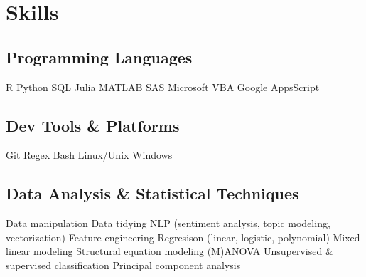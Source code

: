 \documentclass[letterpaper]{deedy-resume_sm} %
\begin{document}

\section{Skills}
\subsection{Programming Languages}
R \textbullet{} Python \textbullet{} SQL \textbullet{} Julia \textbullet{} MATLAB \textbullet{} SAS \textbullet{} Microsoft VBA \textbullet{} Google AppsScript
\subsection{Dev Tools \& Platforms}
Git \textbullet{} Regex \textbullet{} Bash \textbullet{} Linux/Unix \textbullet{} Windows
\subsection{Data Analysis \& Statistical Techniques}
Data manipulation \textbullet{} Data tidying \textbullet{} NLP (sentiment analysis, topic modeling, vectorization) \textbullet{} Feature engineering \textbullet{} Regresison (linear, logistic, polynomial) \textbullet{} Mixed linear modeling \textbullet{} Structural equation modeling \textbullet{} (M)ANOVA \textbullet{} Unsupervised \& supervised classification \textbullet{} Principal component analysis\\
\end{document}
